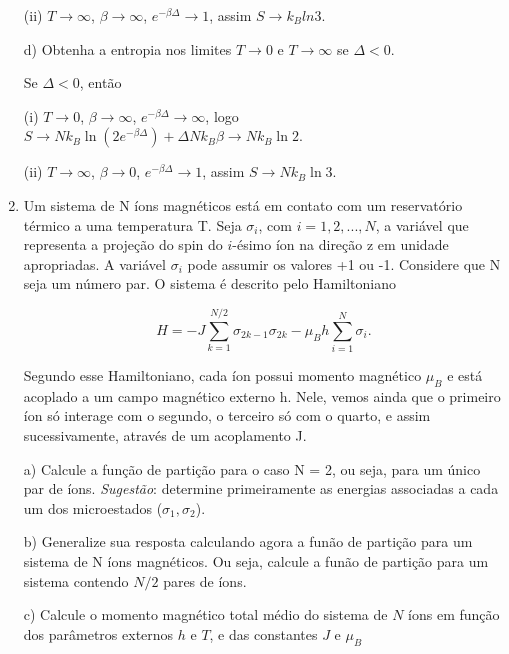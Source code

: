 \begin{enumerate}[start=1,label={\bfseries Q\arabic*.}]
{(ii) $T \rightarrow \infty$, $\beta \rightarrow \infty$, $e^{-\beta \Delta} \rightarrow 1$, assim $S \rightarrow k_{B} ln 3$.

}

d) Obtenha a entropia nos limites $T \rightarrow  0$ e $T \rightarrow \infty$ se $\Delta < 0$.


{\color{red}

Se $\Delta < 0$, então

(i) $T \rightarrow 0$, $\beta \rightarrow \infty$, $e^{-\beta \Delta} \rightarrow \infty$, logo $S \rightarrow N k_{B} \ln \left(2 e^{-\beta \Delta}\right)+\Delta N k_{B} \beta \rightarrow N k_{B} \ln 2$.

(ii) $T \rightarrow \infty$, $\beta \rightarrow 0$, $e^{-\beta \Delta} \rightarrow 1$, assim $S \rightarrow N k_{B} \ln 3$.

}

\item Um sistema de N íons magnéticos está em contato com um reservatório térmico a uma temperatura T. Seja $\sigma_{i}$, com $i = 1, 2, ..., N$, a variável que representa a projeção do spin do $i$-ésimo íon na direção z em unidade apropriadas. A variável $\sigma_{i}$ pode assumir os valores +1 ou -1. Considere que N seja um número par. O sistema é descrito pelo Hamiltoniano

$$
H = - J \sum_{k=1}^{N/2} \sigma_{2k-1} \sigma_{2k} - \mu_{B} h \sum_{i=1}^{N} \sigma_{i}.
$$

Segundo esse Hamiltoniano, cada íon possui momento magnético $\mu_{B}$ e está acoplado a um campo magnético externo h. Nele, vemos ainda que o primeiro íon só interage com o segundo, o terceiro só com o quarto, e assim sucessivamente, através de um acoplamento J.



  a) Calcule a função de partição para o caso N = 2, ou seja, para um único par de íons. \textit{Sugestão}: determine primeiramente as energias associadas a cada um dos microestados ($\sigma_{1}, \sigma_{2}$).

  \resposta

  b) Generalize sua resposta calculando agora a funão de partição para um sistema de N íons magnéticos. Ou seja, calcule a funão de partição para um sistema contendo $N/2$ pares de íons.

  \resposta

  c) Calcule o momento magnético total médio do sistema de $N$ íons em função dos parâmetros externos $h$ e $T$, e das constantes $J$ e $\mu_{B}$


\end{enumerate}
